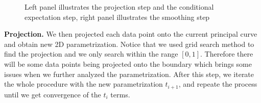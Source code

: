 \documentclass[12pt]{article}
\begin{document}
\begin{figure}[H]
\caption[Principal surfaces algorithm]{\footnotesize Left panel illustrates the projection step and the conditional expectation step, right panel illustrates the smoothing step}
\label{fig.alg}
\begin{minipage}[b]{0.45\linewidth}
\centering
{}
\end{minipage}
\hspace{1cm}
\begin{minipage}[b]{0.45\linewidth}
\centering
{}
\end{minipage}
\end{figure}

{\bf Projection.} We then projected each data point onto the current principal curve and obtain new 2D parametrization. Notice that we used grid search method to find the projection and we only search within the range $[0,1]$. Therefore there will be some data points being projected onto the boundary which brings some issues when we further analyzed the parametrization. After this step, we iterate the whole procedure with the new parametrization $t_{i+1}$, and repeate the process until we get convergence of the $t_i$ terms.\
\end{document}
